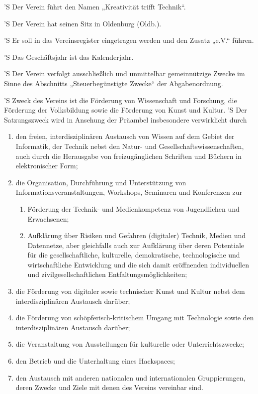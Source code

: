 \documentclass[a4paper,10pt]{scrreprt}
\begin{document}
\begin{contract}

'S Der Verein führt den Namen „Kreativität trifft Technik“.

'S Der Verein hat seinen Sitz in Oldenburg (Oldb.).

'S Er soll in das Vereinsregister eingetragen werden und den Zusatz „e.V.“
führen.

'S Das Geschäftsjahr ist das Kalenderjahr.


'S Der Verein verfolgt ausschließlich und unmittelbar gemeinnützige Zwecke im
Sinne des Abschnitts „Steuerbegünstigte Zwecke“ der Abgabenordnung.

'S Zweck des Vereins ist die Förderung von Wissenschaft und Forschung, die
Förderung der Volksbildung sowie die Förderung von Kunst und Kultur.
'S Der Satzungszweck wird in Ansehung der Präambel insbesondere verwirklicht
durch

\begin{enumerate}
    \item den freien, interdisziplinären Austausch von Wissen auf dem Gebiet
	      der Informatik, der Technik nebst den Natur- und
		  Gesellschaftswissenschaften, auch durch die Herausgabe von
		  freizugänglichen Schriften und Büchern in elektronischer Form;
    \item die Organisation, Durchführung und Unterstützung von
	      Informationsveranstaltungen, Workshops, Seminaren und Konferenzen zur
          \begin{enumerate}
              \item Förderung der Technik- und Medienkompetenz von Jugendlichen
			        und Erwachsenen;
              \item Aufklärung über Risiken und Gefahren (digitaler) Technik,
			        Medien und Datennetze, aber gleichfalls auch zur Aufklärung
					über deren Potentiale für die gesellschaftliche, kulturelle,
                    demokratische, technologische und wirtschaftliche
					Entwicklung und die sich damit eröffnenden individuellen
					und zivilgesellschaftlichen Entfaltungsmöglichkeiten;
          \end{enumerate}
    \item die Förderung von digitaler sowie technischer Kunst und Kultur nebst
	      dem interdisziplinären Austausch darüber;
    \item die Förderung von schöpferisch-kritischem Umgang mit Technologie
	      sowie den interdisziplinären Austausch darüber;
	\item die Veranstaltung von Ausstellungen für kulturelle oder
	      Unterrichtszwecke;
	\item den Betrieb und die Unterhaltung eines Hackspaces;
	\item den Austausch mit anderen nationalen und internationalen
	      Gruppierungen, deren Zwecke und Ziele mit denen des Vereins
		  vereinbar sind.
\end{enumerate}


\end{contract}
\end{document}
